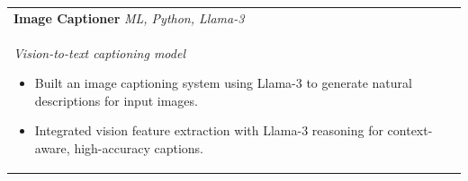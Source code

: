 \documentclass[a4paper,11pt]{article}
\newcommand{\resumeItem}[1]{\item\small{#1}}
\newcommand{\resumeItemListStart}{\begin{itemize}[leftmargin=12pt, itemsep=3pt]}
\newcommand{\resumeItemListEnd}{\end{itemize}\vspace{4pt}}
\newcommand{\projectHeading}[3]{
  \textbf{#1} \hfill {\small\textit{#2}}\\[-2pt]
  {\small\textit{#3}}
}
\begin{document}
\begin{tabularx}{\textwidth}{@{}X X@{}}
\projectHeading{Image Captioner}{ML, Python, Llama-3}{Vision-to-text captioning model}
\resumeItemListStart
\resumeItem{Built an image captioning system using Llama-3 to generate natural descriptions for input images.}
\resumeItem{Integrated vision feature extraction with Llama-3 reasoning for context-aware, high-accuracy captions.}
\resumeItemListEnd
\end{tabularx}
\end{document}

